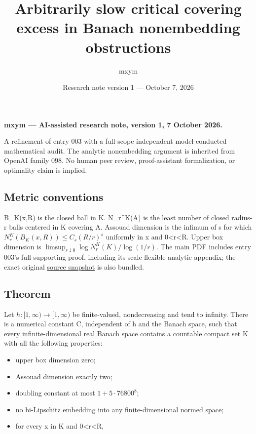 \documentclass[
  11pt,
]{article}
\title{Arbitrarily slow critical covering excess in Banach nonembedding
obstructions}
\author{mxym}
\date{Research note version 1 --- October 7, 2026}
\providecommand{\tightlist}{%
  \setlength{\itemsep}{0pt}\setlength{\parskip}{0pt}}
\theoremstyle{remark}\newtheorem{remark}[theorem]{Remark}
\begin{document}
\maketitle

\textbf{mxym --- AI-assisted research note, version 1, 7 October 2026.}

A refinement of entry 003 with a full-scope independent model-conducted
mathematical audit. The analytic nonembedding argument is inherited from
OpenAI family 098. No human peer review, proof-assistant formalization,
or optimality claim is implied.

\subsection{Metric conventions}\label{metric-conventions}

B\_K(x,R) is the closed ball in K. N\_r\^{}K(A) is the least number of
closed radius-r balls centered in K covering A. Assouad dimension is the
infimum of s for which \(N_r^K(B_K(x,R))\le C_s(R/r)^s\) uniformly in x
and 0\textless r\textless R. Upper box dimension is
\(\limsup_{r\downarrow0}\log N_r^K(K)/\log(1/r)\). The main PDF includes
entry 003's full supporting proof, including its scale-flexible analytic
appendix; the exact original
\href{../avoidance-covering-provenance/sources/mxym-003/assouad_two_zero_box.tex}{source
snapshot} is also bundled.

\subsection{Theorem}\label{theorem}

Let \(h:[1,\infty)\to[1,\infty)\) be finite-valued, nondecreasing and
tend to infinity. There is a numerical constant C, independent of h and
the Banach space, such that every infinite-dimensional real Banach space
contains a countable compact set K with all the following properties:

\begin{itemize}
\tightlist
\item
  upper box dimension zero;
\item
  Assouad dimension exactly two;
\item
  doubling constant at most \(1+5\cdot76800^8\);
\item
  no bi-Lipschitz embedding into any finite-dimensional normed space;
\item
  for every x in K and 0\textless r\textless R,
\end{itemize}
\end{document}
